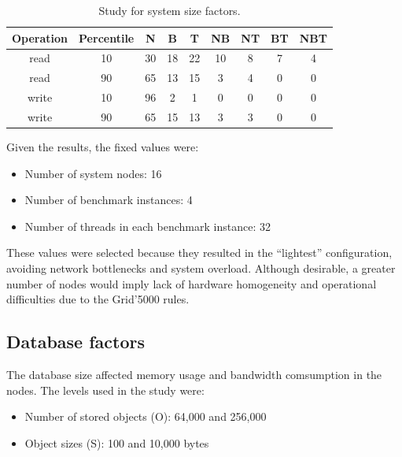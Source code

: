 \documentclass[doublespacing]{bmcart}
\begin{document}
\begin{table}[h!]
\caption{Study for system size factors.}
\begin{tabular}{ccccccccc} \hline

Operation & Percentile & N & B & T & NB & NT & BT & NBT\\\hline

read & 10 & 30 & 18 & 22 & 10 & 8 & 7 & 4 \\

read & 90 & 65 & 13 & 15 & 3 & 4 & 0 & 0 \\

write & 10 & 96 & 2 & 1 & 0 & 0 & 0 & 0 \\

write & 90 & 65 & 15 & 13 & 3 & 3 & 0 & 0 \\\hline

\end{tabular}
\label{tab:estudo_para_fatores_de_tamanho_do_sistema} \end{table}

Given the results, the fixed values were:

\begin{itemize}

\item Number of system nodes: 16

\item Number of benchmark instances: 4

\item Number of threads in each benchmark instance: 32

\end{itemize}

These values were selected because they resulted in the ``lightest''
configuration, avoiding network bottlenecks and system overload. Although
desirable, a greater number of nodes would imply lack of hardware homogeneity
and operational difficulties due to the Grid'5000 rules.

\subsection{Database factors}

The database size affected memory
usage and bandwidth comsumption in the nodes. The levels used in the study were:

\begin{itemize}

\item Number of stored objects (O): 64,000 and 256,000

\item Object sizes (S): 100 and 10,000 bytes

\end{itemize}
\end{document}
